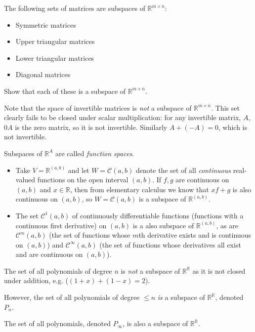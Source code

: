 \documentclass[12pt,letterpaper,reqno]{article}
\numberwithin{equation}{section}
\begin{document}
\begin{example}
The following sets of matrices are subspaces of $\mathbb{R}^{\overline{m} \times \overline{n}}$:
\begin{itemize}
	\item Symmetric matrices
	\item Upper triangular matrices
	\item Lower triangular matrices
	\item Diagonal matrices
\end{itemize}
\begin{exercise}
Show that each of these is a subspace of $\mathbb{R}^{\overline{m} \times \overline{n}}$.	
\end{exercise}

Note that the space of invertible matrices is \emph{not} a subspace of $\mathbb{R}^{\overline{m} \times \overline{n}}$. This set clearly fails to be closed under scalar multiplication: for any invertible matrix, $A$, $0A$ is the zero matrix, so it is not invertible. Similarly $A+(-A)=0$, which is not invertible.
\end{example}

\begin{example}\label{ex:function_spaces}
	Subspaces of $\mathbb{R}^A$ are called \emph{function spaces}.
	\begin{itemize}
	\item Take $V=\mathbb{R}^{(a,b)}$ and let $W=\mathscr{C}(a,b)$ denote the set of all \emph{continuous} real-valued functions on the open interval $(a,b)$. If $f,g$ are continuous on $(a,b)$ and $x \in \mathbb{R}$, then from elementary calculus we know that $xf+g$ is also continuous on $(a,b)$, so $W=\mathscr{C}(a,b)$ is a subspace of $\mathbb{R}^{(a,b)}$.
	\item The set $\mathscr{C}^1(a,b)$ of continuously differentiable functions (functions with a continuous first derivative) on $(a,b)$ is a also subspace of $\mathbb{R}^{(a,b)}$, as are  $\mathscr{C}^m(a,b)$ (the set of functions whose $m$th derivative exists and is continuous on $(a,b)$) and $\mathscr{C}^\infty(a,b)$ (the set of functions whose derivatives all exist and are continuous on $(a,b)$).
\end{itemize}
\end{example}

\begin{example}[Polynomials]\label{ex:polynomials}
	The set of all polynomials of degree $n$ is \emph{not} a subspace of $\mathbb{R}^\mathbb{R}$ as it is not closed under addition, e.g. ($(1+x)+(1-x)=2$). 
	
However, the set of all polynomials of degree $\leq n$ \emph{is} a subspace of $\mathbb{R}^\mathbb{R}$, denoted $P_n$. 

The set of all polynomials, denoted $P_\infty$, is also a subspace of $\mathbb{R}^\mathbb{R}$.
\end{example}
\end{document}
